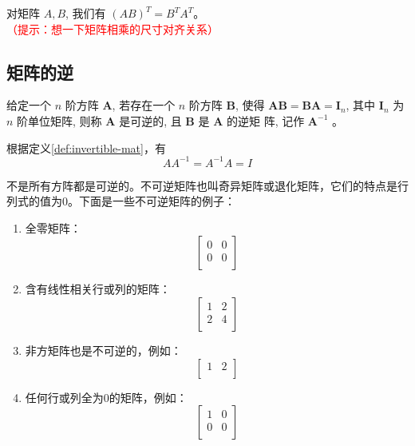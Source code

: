 \documentclass[lang=cn,newtx,10pt,scheme=chinese]{elegantbook}
\begin{document}
\begin{theorem}[转置运算的性质] \label{thm:transpose-property}
    对矩阵 $A, B$, 我们有 $(A B)^T=B^T A^T$。\textcolor{red}{（提示：想一下矩阵相乘的尺寸对齐关系）}
\end{theorem}

\subsection{矩阵的逆}

\begin{definition} \label{def:invertible-mat}
    给定一个 $n$ 阶方阵 $\mathbf{A}$, 若存在一个 $n$ 阶方阵 $\mathbf{B}$, 使得 $\mathbf{A B}=\mathbf{B} \mathbf{A}=\mathbf{I}_n$, 其中 $\mathbf{I}_n$ 为 $n$ 阶单位矩阵, 则称 $\mathbf{A}$ 是可逆的, 且 $\mathbf{B}$ 是 $\mathbf{A}$ 的逆矩 阵, 记作 $\mathbf{A}^{-1}$ 。
\end{definition}

根据定义\ref{def:invertible-mat}，有
$$
A A^{-1}=A^{-1} A=I
$$

不是所有方阵都是可逆的。不可逆矩阵也叫奇异矩阵或退化矩阵，它们的特点是行列式的值为0。下面是一些不可逆矩阵的例子：

\begin{enumerate}
\item 全零矩阵：
   \[
   \begin{bmatrix}
   0 & 0 \\
   0 & 0 \\
   \end{bmatrix}
   \]

\item 含有线性相关行或列的矩阵：
   \[
   \begin{bmatrix}
   1 & 2 \\
   2 & 4 \\
   \end{bmatrix}
   \]

\item 非方矩阵也是不可逆的，例如：
   \[
   \begin{bmatrix}
   1 & 2 \\
   \end{bmatrix}
   \]

\item 任何行或列全为0的矩阵，例如：
   \[
   \begin{bmatrix}
   1 & 0 \\
   0 & 0 \\
   \end{bmatrix}
   \]
\end{enumerate}
\end{document}
